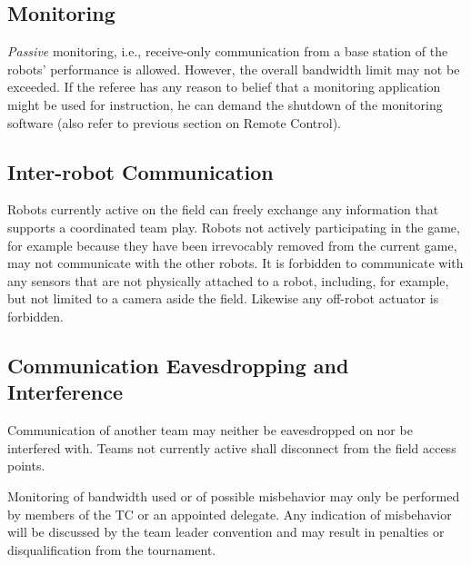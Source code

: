 \documentclass[12pt,twoside]{article}
\begin{document}
\subsection{Monitoring}
\label{sec:monitoring}
\emph{Passive} monitoring, i.e., receive-only communication from a base
station of the robots' performance is allowed. However, the overall
bandwidth limit may not be exceeded.
If the referee has any reason to belief that a monitoring application
might be used for instruction, he can demand the shutdown of the
monitoring software (also refer to previous section on Remote
Control).

\subsection{Inter-robot Communication}
\label{sec:inter-robot-comm}
Robots currently active on the field can freely exchange any
information that supports a coordinated team play. Robots not actively
participating in the game, for example because they have been
irrevocably removed from the current game, may not communicate with
the other robots. It is forbidden to communicate with any sensors that
are not physically attached to a robot, including, for example, but
not limited to a camera aside the field. Likewise any off-robot
actuator is forbidden.

\subsection{Communication Eavesdropping and Interference}
\label{sec:comm-tampering}
Communication of another team may neither be eavesdropped on nor be
interfered with. Teams not currently active shall disconnect from the
field access points.

Monitoring of bandwidth used or of possible misbehavior may only be
performed by members of the \ac{TC} or an appointed delegate.
Any indication of misbehavior will be discussed by the team leader
convention and may result in penalties or disqualification from the
tournament.
\end{document}
